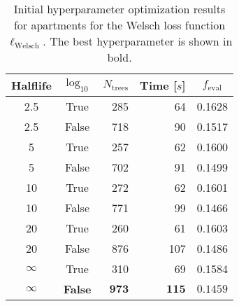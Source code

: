 \begin{table}[h!]
  \centerfloat
  \begin{tabular}{@{}ccrrc@{}}
    Halflife & $\log_{10}$ & $N_\mathrm{trees}$ & Time [$s$] & $f_\mathrm{eval}$ \\
    \midrule
    \num{2.5} & True & \num{285} & \num{64} & \num{0.1628} \\
    \num{2.5} & False & \num{718} & \num{90} & \num{0.1517} \\
    \num{5} & True & \num{257} & \num{62} & \num{0.1600} \\
    \num{5} & False & \num{702} & \num{91} & \num{0.1499} \\
    \num{10} & True & \num{272} & \num{62} & \num{0.1601} \\
    \num{10} & False & \num{771} & \num{99} & \num{0.1466} \\
    \num{20} & True & \num{260} & \num{61} & \num{0.1603} \\
    \num{20} & False & \num{876} & \num{107} & \num{0.1486} \\
    $\infty$ & True & \num{310} & \num{69} & \num{0.1584} \\
    $\bm{\infty}$ & \textbf{False} & $\mathbf{973}$ & $\mathbf{115}$ & $\mathbf{0.1459}$ \\
  \end{tabular}
  \caption[Initial Hyperparameter Optimization Results for Apartments -- Welsch Loss Function]{\label{tab:h:HPO_initial_Welsch-ejerlejlighed-appendix}Initial hyperparameter optimization results for apartments for the Welsch loss function $\ell_\mathrm{Welsch}$. The best hyperparameter is shown in bold.}
\end{table}



